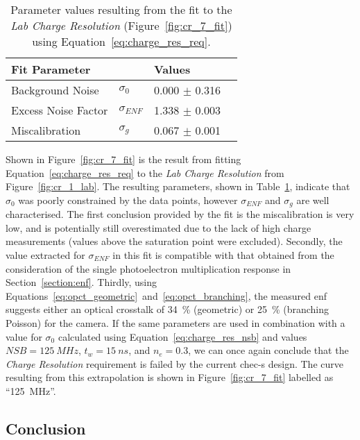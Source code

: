 \begin{table}[h]
\centering
\begin{tabular}{ll|ll} \toprule
    Fit Parameter        &                & Values             \\ \midrule
    Background Noise     & $\sigma_0$     & 0.000 $\pm$ 0.316  \\
    Excess Noise Factor  & $\sigma_{ENF}$ & 1.338 $\pm$ 0.003  \\
    Miscalibration       & $\sigma_g$     & 0.067 $\pm$ 0.001  \\ \bottomrule
\end{tabular}
\caption{Parameter values resulting from the fit to the \textit{Lab Charge Resolution} (Figure~\ref{fig:cr_7_fit}) using Equation~\ref{eq:charge_res_req}.}
\label{table:cr_7_fit}
\end{table}

Shown in Figure~\ref{fig:cr_7_fit} is the result from fitting Equation~\ref{eq:charge_res_req} to the \textit{Lab Charge Resolution} from Figure~\ref{fig:cr_1_lab}. The resulting parameters, shown in Table~\ref{table:cr_7_fit}, indicate that $\sigma_0$ was poorly constrained by the data points, however $\sigma_{ENF}$ and $\sigma_g$ are well characterised. The first conclusion provided by the fit is the miscalibration is very low, and is potentially still overestimated due to the lack of high charge measurements (values above the saturation point were excluded). Secondly, the value extracted for $\sigma_{ENF}$ in this fit is compatible with that obtained from the consideration of the single photoelectron multiplication response in Section~\ref{section:enf}. Thirdly, using Equations~\ref{eq:opct_geometric}~and~\ref{eq:opct_branching}, the measured \gls{enf} suggests either an optical crosstalk of \SI{34}{\percent} (geometric) or \SI{25}{\percent} (branching Poisson) for the camera. If the same parameters are used in combination with a value for $\sigma_0$ calculated using Equation~\ref{eq:charge_res_nsb} and values $\mathit{NSB} = \SI{125}{MHz}$, $t_w = \SI{15}{ns}$, and $n_e = 0.3$, we can once again conclude that the \textit{Charge Resolution} requirement is failed by the current \gls{chec-s} design. The curve resulting from this extrapolation is shown in Figure~\ref{fig:cr_7_fit} labelled as ``\SI{125}{MHz}''.

\subsection{Conclusion}

